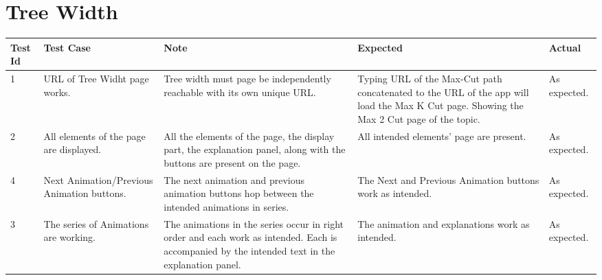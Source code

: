 \section{Tree Width}
\begin{tabular}{ |p{1cm}|p{2cm}|p{4cm}|p{2cm}|p{2cm}| }
 \hline
 \textbf{Test Id} & \textbf{Test Case} & \textbf{Note} & \textbf{Expected} & \textbf{Actual} \\
 \hline
 1 
 & URL of Tree Widht page works. 
 & Tree width must page be independently reachable with its own unique
   URL.
 & Typing URL of the Max-Cut path concatenated to the URL of the app will load the
   Max K Cut page. Showing the Max 2 Cut page of the topic.
 & As expected. \\
 \hline
 2 
 & All elements of the page are displayed.
 & All the elements of the page, the display part, the explanation panel, along with the
   buttons are present on the page.
 & All intended elements' page are present.
 & As expected. \\
 \hline
 4 
 & Next Animation/Previous Animation buttons.
 & The next animation and previous animation buttons hop between the intended animations
   in series.
 & The Next and Previous Animation buttons work as intended.
 & As expected. \\
 \hline
 3 
 & The series of Animations are working.
 & The animations in the series occur in right order and each work as intended. 
   Each is accompanied by the intended text in the explanation panel.
 & The animation and explanations work as intended.
 & As expected. \\
 \hline
\end{tabular}
